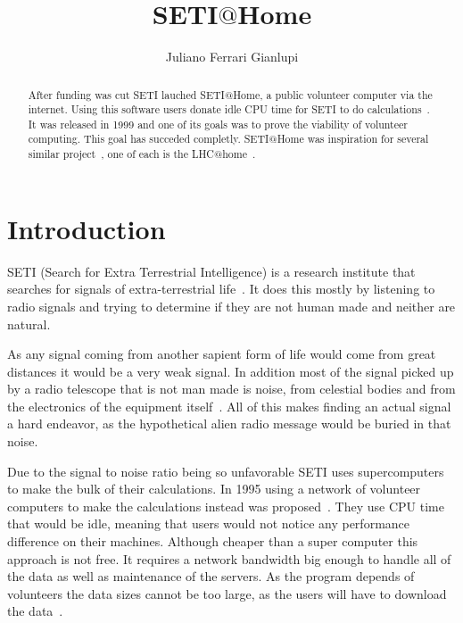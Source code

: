 
\title{SETI$@$Home}

\author{Juliano Ferrari Gianlupi}


\renewcommand{\shortauthors}{J. F. Gianlupi}


\begin{abstract}
After funding was cut SETI lauched SETI$@$Home, a public volunteer computer 
via the internet. Using this software users donate idle CPU time for SETI to do 
calculations~\cite{hid-sp18-601-www-sathome-about}. It was released in 1999 and 
one of its goals was to prove the viability of volunteer computing. This goal 
has succeded completly. SETI$@$Home was inspiration for several similar
project~\cite{hid-sp18-601-www-boinc-projects}, one of each is the 
 LHC$@$home~\cite{hid-sp18-601-www-lhc-at-home-history}.
\end{abstract}



\maketitle

\section{Introduction}\label{hid-sp18-601-section-introduction}
SETI (Search for Extra Terrestrial Intelligence) is a research institute that 
searches for signals of extra-terrestrial 
life~\cite{hid-sp18-601-paper-cocconi1959searching}. It does this mostly by 
listening to radio signals and trying to determine if they are not human made 
and neither are natural. 

As any signal coming from another sapient form of life would come from great 
distances it would be a very weak signal. In addition most of the signal picked 
up by a radio telescope that is not man made is noise, from celestial bodies 
and from the electronics of the equipment 
itself~\cite{hid-sp18-601-paper-anderson2002seti}. All of this makes finding an 
actual signal a hard endeavor, as the hypothetical alien radio message would be 
buried in that noise.

Due to the signal to noise ratio being so unfavorable SETI uses supercomputers 
to make the bulk of their calculations. In 1995 using a network of volunteer 
computers to make the calculations instead was 
proposed~\cite{hid-sp18-601-book-foster1999carl}. They use CPU time that would
be idle, meaning that users would not notice any performance difference on 
their machines. Although cheaper than a super computer this approach is 
not free. It requires a network bandwidth big enough
to handle all of the data as well as maintenance of the servers. As the 
program depends of volunteers the data sizes cannot be too large, as the users
will have to download the data~\cite{hid-sp18-601-paper-anderson2002seti}.


